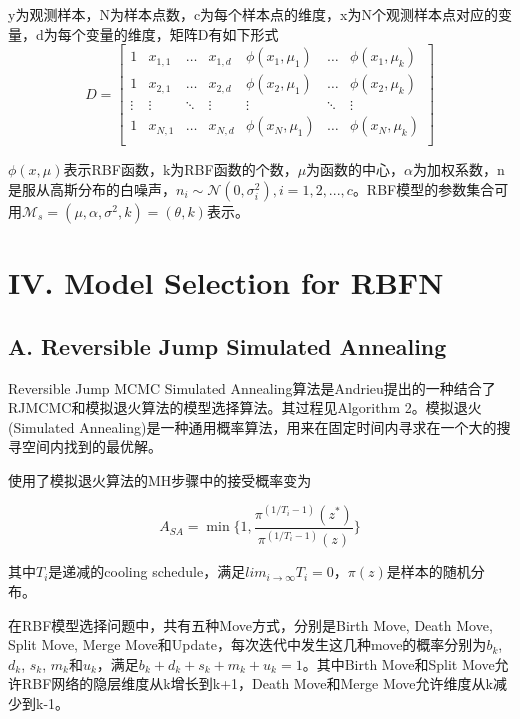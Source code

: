 \documentclass[twocolumn]{article}
\begin{document}
y为观测样本，N为样本点数，c为每个样本点的维度，x为N个观测样本点对应的变量，d为每个变量的维度，矩阵D有如下形式
$$D=\begin{bmatrix}

    1 & x_{1,1} & \dots & x_{1,d} & \phi(x_1, \mu_1) & \dots & \phi(x_1, \mu_k) \\
    1 & x_{2,1} & \dots & x_{2,d} & \phi(x_2, \mu_1) & \dots & \phi(x_2, \mu_k) \\
    \vdots & \vdots & \ddots & \vdots & \vdots & \ddots & \vdots \\
    1 & x_{N,1} & \dots & x_{N,d} & \phi(x_N, \mu_1) & \dots & \phi(x_N, \mu_k) \\

\end{bmatrix}$$



$\phi(x,\mu)$表示RBF函数，k为RBF函数的个数，$\mu$为函数的中心，$\alpha$为加权系数，n是服从高斯分布的白噪声，$n_i\sim\mathcal{N}(0,\sigma_i^2),i=1,2,...,c$。RBF模型的参数集合可用$\mathcal{M}_s=(\mu, \alpha, \sigma^2, k)=(\theta, k)$表示。

\section*{\centering IV. Model Selection for RBFN}

\subsection*{A. Reversible Jump Simulated Annealing}

Reversible Jump MCMC Simulated Annealing算法\cite{DBLP}是Andrieu提出的一种结合了RJMCMC和模拟退火算法的模型选择算法。其过程见Algorithm 2。模拟退火(Simulated Annealing)\cite{1983Sci...220..671K}是一种通用概率算法，用来在固定时间内寻求在一个大的搜寻空间内找到的最优解。

使用了模拟退火算法的MH步骤中的接受概率变为

$$A_{SA} = \min \{1, \frac{\pi^{(1/T_i-1)}(z^*)}{\pi^{(1/T_i-1)}(z)}\}$$

其中$T_i$是递减的cooling schedule，满足$lim_{i\rightarrow \infty}T_i = 0$，$\pi(z)$是样本的随机分布。

在RBF模型选择问题中，共有五种Move方式，分别是Birth Move, Death Move, Split Move, Merge Move和Update，每次迭代中发生这几种move的概率分别为$b_k$, $d_k$, $s_k$, $m_k$和$u_k$，满足$b_k+d_k+s_k+m_k+u_k = 1$。其中Birth Move和Split Move允许RBF网络的隐层维度从k增长到k+1，Death Move和Merge Move允许维度从k减少到k-1。
\end{document}
